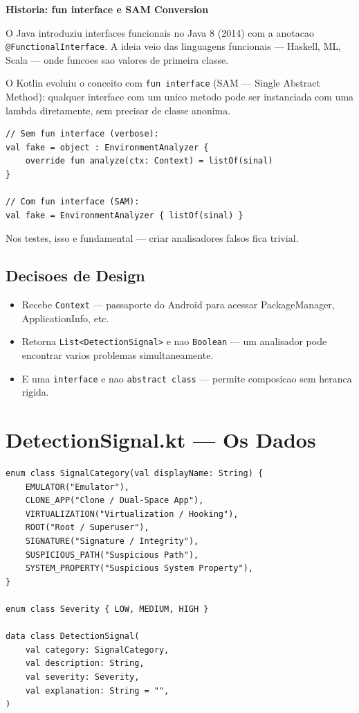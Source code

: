 \documentclass[12pt,a4paper]{article}
\begin{document}
\begin{historybox}
\textbf{Historia: fun interface e SAM Conversion}

O Java introduziu interfaces funcionais no Java 8 (2014) com a anotacao
\texttt{@FunctionalInterface}. A ideia veio das linguagens funcionais --- Haskell,
ML, Scala --- onde funcoes sao valores de primeira classe.

O Kotlin evoluiu o conceito com \texttt{fun interface} (SAM --- Single Abstract Method):
qualquer interface com um unico metodo pode ser instanciada com uma lambda diretamente,
sem precisar de classe anonima.

\begin{lstlisting}
// Sem fun interface (verbose):
val fake = object : EnvironmentAnalyzer {
    override fun analyze(ctx: Context) = listOf(sinal)
}

// Com fun interface (SAM):
val fake = EnvironmentAnalyzer { listOf(sinal) }
\end{lstlisting}

Nos testes, isso e fundamental --- criar analisadores falsos fica trivial.
\end{historybox}

\subsection{Decisoes de Design}

\begin{itemize}
  \item Recebe \texttt{Context} --- passaporte do Android para acessar PackageManager,
        ApplicationInfo, etc.
  \item Retorna \texttt{List<DetectionSignal>} e nao \texttt{Boolean} --- um
        analisador pode encontrar varios problemas simultaneamente.
  \item E uma \texttt{interface} e nao \texttt{abstract class} --- permite composicao
        sem heranca rigida.
\end{itemize}

\newpage

\section{DetectionSignal.kt --- Os Dados}

\begin{lstlisting}
enum class SignalCategory(val displayName: String) {
    EMULATOR("Emulator"),
    CLONE_APP("Clone / Dual-Space App"),
    VIRTUALIZATION("Virtualization / Hooking"),
    ROOT("Root / Superuser"),
    SIGNATURE("Signature / Integrity"),
    SUSPICIOUS_PATH("Suspicious Path"),
    SYSTEM_PROPERTY("Suspicious System Property"),
}

enum class Severity { LOW, MEDIUM, HIGH }

data class DetectionSignal(
    val category: SignalCategory,
    val description: String,
    val severity: Severity,
    val explanation: String = "",
)
\end{lstlisting}
\end{document}
